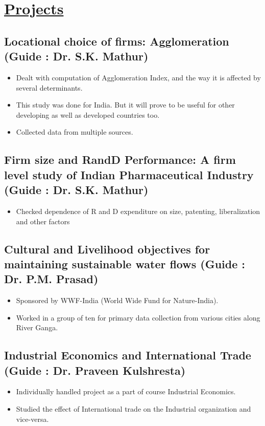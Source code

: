 \documentclass[12pt]{article}
\begin{document}
\section*{\underline {Projects}}



\subsection*{Locational choice of firms: Agglomeration (Guide : Dr. S.K. Mathur)}
\begin{itemize}
	\item Dealt with computation \cite{citation} of Agglomeration Index, and the way it is affected by several determinants.
	\item This study was done for India. But it will prove to be useful for other developing as well as developed countries too.
	\item Collected data from multiple sources.
\end{itemize}

\subsection*{Firm size and RandD Performance: A firm level study of Indian Pharmaceutical Industry (Guide : Dr. S.K. Mathur)}
\begin{itemize}
	\item Checked dependence of R and D expenditure on size, patenting, liberalization and other factors
\end{itemize}

\subsection*{Cultural and Livelihood objectives for maintaining sustainable water flows (Guide : Dr. P.M. Prasad)}
\begin{itemize}
	\item Sponsored by WWF-India (World Wide Fund for Nature-India).
	\item Worked in a group of ten for primary data collection from various cities along River Ganga.
\end{itemize}

\subsection*{Industrial Economics and International Trade (Guide : Dr. Praveen Kulshresta)}
\begin{itemize} 
	\item Individually handled project as a part of course Industrial Economics.
	\item Studied the effect of International trade on the Industrial organization and vice-versa.
\end{itemize}
\end{document}
